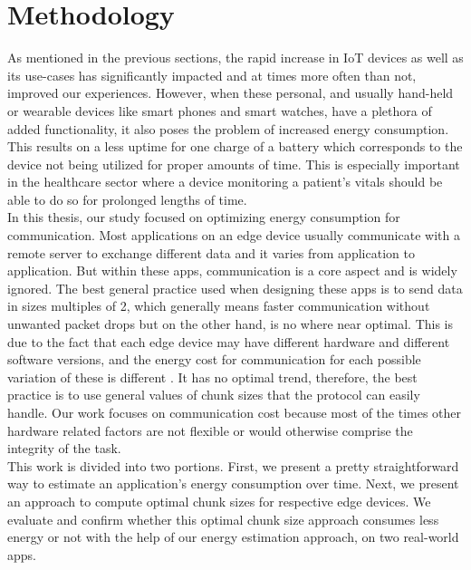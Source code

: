 \chapter{Methodology}
\newtheorem{definition}{Definition}
As mentioned in the previous sections, the rapid increase in IoT devices as well as its use-cases has 
significantly impacted and at times more often than not, improved our experiences. However, when these 
personal, and usually hand-held or wearable devices like smart phones and smart watches, have a 
plethora of added functionality, it also poses the problem of increased energy consumption. This results 
on a less uptime for one charge of a battery which corresponds to the device not being utilized for proper 
amounts of time. This is especially important in the healthcare sector where a device monitoring a patient's 
vitals should be able to do so for prolonged lengths of time. \\
In this thesis, our study focused on optimizing energy consumption for communication. Most applications 
on an edge device usually communicate with a remote server to exchange different data and it varies from 
application to application. But within these apps, communication is a core aspect and is widely ignored. 
The best general practice used when designing these apps is to send data in sizes multiples of 2, which 
generally means faster communication without unwanted packet drops but on the other hand, is no where near 
optimal. This is due to the fact that each edge device may have different hardware and different software 
versions, and the energy cost for communication for each possible variation of these is different \cite{6200281}. It has no 
optimal trend, therefore, the best practice is to use general values of chunk sizes that the protocol 
can easily handle. Our work focuses on communication cost because most of the times other hardware related 
factors are not flexible or would otherwise comprise the integrity of the task. \\

This work is divided into two portions. First, we present a pretty straightforward way to estimate an 
application's energy consumption over time. Next, we present an approach to compute optimal chunk sizes 
for respective edge devices. We evaluate and confirm whether this optimal chunk size approach consumes less 
energy or not with the help of our energy estimation approach, on two real-world apps. \\

